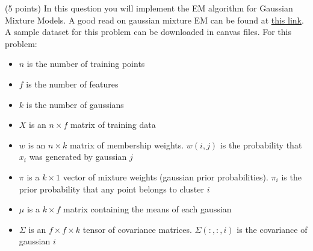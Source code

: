 \documentclass{exam}
\begin{document}
\begin{questions}

\newpage
{}\label{q4} (5 points)
In this question you will implement the EM algorithm for Gaussian Mixture Models. A good read on gaussian
mixture EM can be found at \href{https://www.ics.uci.edu/~smyth/courses/cs274/notes/Notes7_Mixtures_and_EM.pdf}{this link}. A
sample dataset for this problem can be downloaded in canvas files. For this problem:
\begin{itemize}
\item $n$ is the number of training points
\item $f$ is the number of features
\item $k$ is the number of gaussians
\item $X$ is an $n\times f$ matrix of training data
\item $w$ is an $n\times k$ matrix of membership weights. $w(i, j)$ is the probability that $x_i$ was generated by gaussian $j$
\item $\pi$ is a $k\times 1$ vector of mixture weights (gaussian prior probabilities). $\pi_i$ is the prior probability that any point belongs to cluster $i$
\item $\mu$ is a $k\times f$ matrix containing the means of each gaussian
\item $\Sigma$ is an $ f \times f\times k$ tensor of covariance matrices. $\Sigma(:, :, i)$ is the covariance of gaussian $i$
\end{itemize}


\end{questions}
\end{document}
